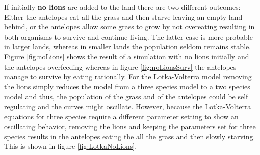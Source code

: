 \documentclass[11pt]{article}
\begin{document}
If initially {\bf no lions} are added to the land there are two different outcomes: Either the antelopes eat all the grass and then starve leaving an empty land behind, or the antelopes allow some grass to grow by not overeating resulting in both organisms to survive and continue living. The latter case is more probable in larger lands, whereas in smaller lands the population seldom remains stable. Figure \ref{fig:noLions} shows the result of a simulation with no lions initially and the antelopes overfeeding whereas in figure \ref{fig:noLionsSurv} the antelopes manage to survive by eating rationally. For the Lotka-Volterra model removing the lions simply reduces the model from a three species model to a two species model and thus, the population of the grass and of the antelopes could be self regulating and the curves might oscillate. However, because the Lotka-Volterra equations for three species require a different parameter setting to show an oscillating behavior, removing the lions and keeping the parameters set for three species results in the antelopes eating the all the grass and then slowly starving. This is shown in figure \ref{fig:LotkaNoLions}.
\end{document}
